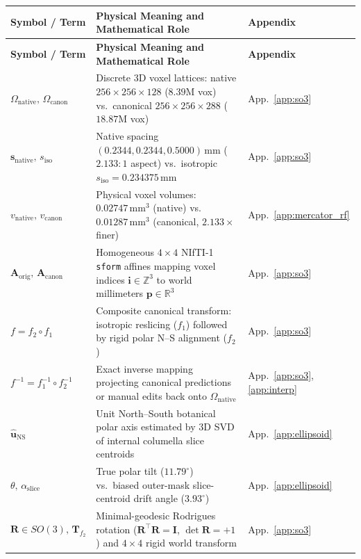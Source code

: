 \documentclass[10pt,a4paper]{article}
\renewcommand{\_}{\origunderscore\allowbreak}
\begin{document}
{\footnotesize
\renewcommand{\arraystretch}{1.24}
\begin{xltabular}{\textwidth}{L{2.85cm} Y L{2.15cm}}
\toprule
{}\textbf{Symbol / Term} & \textbf{Physical Meaning and Mathematical Role} & \textbf{Appendix} \\
\midrule
\endfirsthead
\toprule
{}\textbf{Symbol / Term} & \textbf{Physical Meaning and Mathematical Role} & \textbf{Appendix} \\
\midrule
\endhead
\bottomrule
\endfoot
$\Omega_{\text{native}},\, \Omega_{\text{canon}}$ & Discrete 3D voxel lattices: native $256\times 256\times 128$ ($8.39\text{M}$ vox) vs.\ canonical $256\times 256\times 288$ ($18.87\text{M}$ vox) & App.~\ref{app:so3} \\
$\mathbf{s}_{\text{native}},\, s_{\text{iso}}$ & Native spacing $(0.2344, 0.2344, 0.5000)\,\text{mm}$ ($2.133:1$ aspect) vs.\ isotropic $s_{\text{iso}} = 0.234375\,\text{mm}$ & App.~\ref{app:so3} \\
$v_{\text{native}},\, v_{\text{canon}}$ & Physical voxel volumes: $0.02747\,\text{mm}^3$ (native) vs.\ $0.01287\,\text{mm}^3$ (canonical, $2.133\times$ finer) & App.~\ref{app:mercator_rf} \\
$\mathbf{A}_{\text{orig}},\, \mathbf{A}_{\text{canon}}$ & Homogeneous $4\times 4$ NIfTI-1 \texttt{sform} affines mapping voxel indices $\mathbf{i}\in\mathbb{Z}^3$ to world millimeters $\mathbf{p}\in\mathbb{R}^3$ & App.~\ref{app:so3} \\
$f = f_2 \circ f_1$ & Composite canonical transform: isotropic reslicing ($f_1$) followed by rigid polar N--S alignment ($f_2$) & App.~\ref{app:so3} \\
$f^{-1} = f_1^{-1}\circ f_2^{-1}$ & Exact inverse mapping projecting canonical predictions or manual edits back onto $\Omega_{\text{native}}$ & App.~\ref{app:so3}, \ref{app:interp} \\
$\hat{\mathbf{u}}_{\text{NS}}$ & Unit North--South botanical polar axis estimated by 3D SVD of internal columella slice centroids & App.~\ref{app:ellipsoid} \\
$\theta,\,\alpha_{\text{slice}}$ & True polar tilt ($11.79^\circ$) vs.\ biased outer-mask slice-centroid drift angle ($3.93^\circ$) & App.~\ref{app:ellipsoid} \\
$\mathbf{R}\in SO(3),\,\mathbf{T}_{f_2}$ & Minimal-geodesic Rodrigues rotation ($\mathbf{R}^\top\mathbf{R}=\mathbf{I}$, $\det\mathbf{R}=+1$) and $4\times 4$ rigid world transform & App.~\ref{app:so3} \\

\end{xltabular}}
\end{document}
